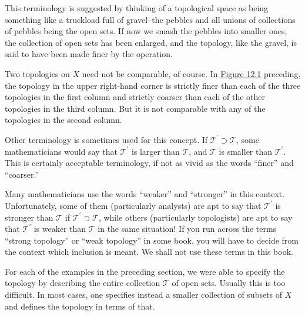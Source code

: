 This terminology is suggested by thinking of a topological space as being something like a truckload full of gravel--the pebbles and all unions of collections of pebbles being the open sets. If now we smash the pebbles into smaller ones, the collection of open sets has been enlarged, and the topology, like the gravel, is said to have been made finer by the operation.

Two topologies on \(X\) need not be comparable, of course. In \hyperref[fig:12.1]{Figure 12.1} preceding, the topology in the upper right-hand corner is strictly finer than each of the three topologies in the first column and strictly coarser than each of the other topologies in the third column. But it is not comparable with any of the topologies in the second column.

Other terminology is sometimes used for this concept. If \(\mathcal{T}^{\prime } \supset \mathcal{T}\), some mathematicians would say that \(\mathcal{T}^{\prime }\) is larger than \(\mathcal{T}\), and \(\mathcal{T}\) is smaller than \(\mathcal{T}^{\prime }\). This is certainly acceptable terminology, if not as vivid as the words ``finer'' and ``coarser.''

Many mathematicians use the words ``weaker'' and ``stronger'' in this context. Unfortunately, some of them (particularly analysts) are apt to say that \(\mathcal{T}^{\prime }\) is stronger than \(\mathcal{T}\) if \(\mathcal{T}^{\prime } \supset \mathcal{T}\), while others (particularly topologists) are apt to say that \(\mathcal{T}^{\prime }\) is weaker than \(\mathcal{T}\) in the same situation! If you run across the terms ``strong topology'' or ``weak topology'' in some book, you will have to decide from the context which inclusion is meant. We shall not use these terms in this book.


For each of the examples in the preceding section, we were able to specify the topology by describing the entire collection \(\mathcal{T}\) of open sets. Usually this is too difficult. In most cases, one specifies instead a smaller collection of subsets of \(X\) and defines the topology in terms of that.

